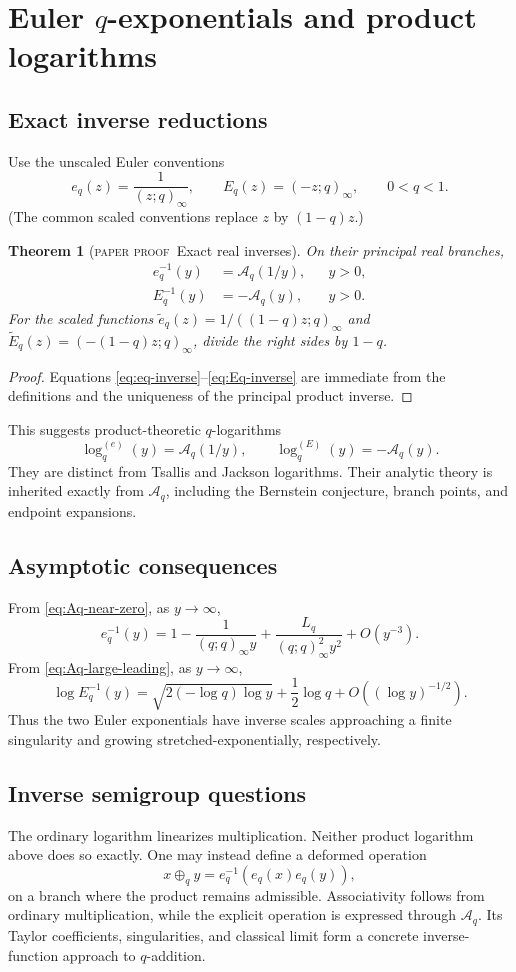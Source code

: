 \documentclass[11pt,oneside]{article}
\newtheorem{theorem}{Theorem}[section]
\theoremstyle{definition}
\theoremstyle{remark}
\theoremstyle{plain}
\theoremstyle{definition}
\theoremstyle{remark}
\newcommand{\Aq}{\mathcal A_q}
\newcommand{\statusproved}{\textcolor{provedgreen}{\textsc{paper proof}}}
\numberwithin{equation}{section}
\numberwithin{figure}{section}
\numberwithin{table}{section}
\let\reporttopsection\section
\let\reportsubsection\subsection
\let\reportsubsubsection\subsubsection
\let\chapter\reporttopsection
\let\section\reportsubsection
\let\subsection\reportsubsubsection
\begin{document}
\chapter{Euler \texorpdfstring{\(q\)}{q}-exponentials and product logarithms}

\section{Exact inverse reductions}
Use the unscaled Euler conventions
\[
 e_q(z)=\frac1{(z;q)_\infty},
 \qquad
 E_q(z)=(-z;q)_\infty,
 \qquad 0<q<1.
\]
(The common scaled conventions replace \(z\) by \((1-q)z\).)

\begin{theorem}[\statusproved\ Exact real inverses]
On their principal real branches,
\begin{align}
 e_q^{-1}(y)&=\Aq(1/y),&&y>0,\label{eq:eq-inverse}\\
 E_q^{-1}(y)&=-\Aq(y),&&y>0.\label{eq:Eq-inverse}
\end{align}
For the scaled functions
\(\widetilde e_q(z)=1/((1-q)z;q)_\infty\) and
\(\widetilde E_q(z)=(-(1-q)z;q)_\infty\), divide the right sides by
\(1-q\).
\end{theorem}
\begin{proof}
Equations \eqref{eq:eq-inverse}--\eqref{eq:Eq-inverse} are immediate from the
definitions and the uniqueness of the principal product inverse.
\end{proof}

This suggests product-theoretic \(q\)-logarithms
\[
 \log_q^{(e)}(y)=\Aq(1/y),
 \qquad
 \log_q^{(E)}(y)=-\Aq(y).
\]
They are distinct from Tsallis and Jackson logarithms.  Their analytic theory is
inherited exactly from \(\Aq\), including the Bernstein conjecture, branch
points, and endpoint expansions.

\section{Asymptotic consequences}
From \eqref{eq:Aq-near-zero}, as \(y\to\infty\),
\[
 e_q^{-1}(y)=1-\frac1{(q;q)_\infty y}
 +\frac{L_q}{(q;q)_\infty^2y^2}+O(y^{-3}).
\]
From \eqref{eq:Aq-large-leading}, as \(y\to\infty\),
\[
 \log E_q^{-1}(y)
 =\sqrt{2(-\log q)\log y}+\frac12\log q
 +O((\log y)^{-1/2}).
\]
Thus the two Euler exponentials have inverse scales approaching a finite
singularity and growing stretched-exponentially, respectively.

\section{Inverse semigroup questions}
The ordinary logarithm linearizes multiplication.  Neither product logarithm
above does so exactly.  One may instead define a deformed operation
\[
 x\oplus_q y=e_q^{-1}(e_q(x)e_q(y)),
\]
on a branch where the product remains admissible.  Associativity follows from
ordinary multiplication, while the explicit operation is expressed through
\(\Aq\).  Its Taylor coefficients, singularities, and classical limit form a
concrete inverse-function approach to \(q\)-addition.
\end{document}
